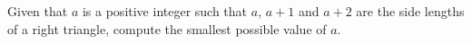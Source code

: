 Given that $a$ is a positive integer such that $a$, $a+1$ and $a+2$ are the side lengths of a right triangle, compute the smallest possible value of $a$.
